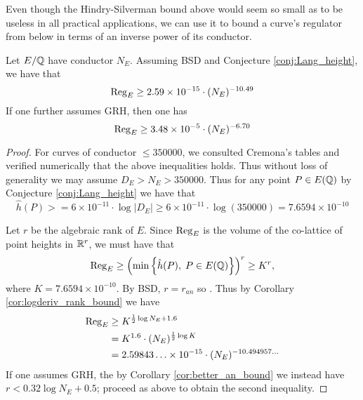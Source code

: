 Even though the Hindry-Silverman bound above would seem so small as to be useless in all practical applications, we can use it to bound a curve's regulator from below in terms of an inverse power of its conductor.
\begin{theorem}\label{thm:regulator_lower_bound}
Let $E/\mathbb{Q}$ have conductor $N_E$. Assuming BSD and Conjecture \ref{conj:Lang_height}, we have that
\begin{equation}
\operatorname{Reg}_E \ge 2.59 \times 10^{-15} \cdot (N_E)^{-10.49}
\end{equation}
If one further assumes GRH, then one has
\begin{equation}
\operatorname{Reg}_E \ge 3.48 \times 10^{-5} \cdot (N_E)^{-6.70}
\end{equation}
\end{theorem}
\begin{proof}
For curves of conductor $\le 350000$, we consulted Cremona's tables and verified numerically that the above inequalities holds. Thus without loss of generality we may assume $D_E > N_E > 350000$. Thus for any point $P \in E(\mathbb{Q})$ by Conjecture \ref{conj:Lang_height} we have that
\begin{equation}
\hat{h}(P) >= 6\times10^{-11} \cdot \log |D_E| \ge 6\times10^{-11} \cdot \log(350000) = 7.6594 \times 10^{-10}
\end{equation}

Let $r$ be the algebraic rank of $E$. Since $\operatorname{Reg}_E$ is the volume of the co-lattice of point heights in $\mathbb{R}^r$, we must have that
\begin{equation*}
\operatorname{Reg}_E \ge \left(\min \left\{ \hat{h}(P), \; P \in E(\mathbb{Q})\right\}\right)^r \ge  K^r,
\end{equation*}
where $K = 7.6594 \times 10^{-10}$. By BSD, $r = r_{an}$ so . Thus by Corollary \ref{cor:logderiv_rank_bound} we have
\begin{align*}
\operatorname{Reg}_E &\ge K^{\frac{1}{2} \log N_E + 1.6} \\
&= K^{1.6} \cdot (N_E)^{\frac{1}{2} \log K} \\
&= 2.59843\ldots \times 10^{-15} \cdot (N_E)^{-10.494957\ldots}
\end{align*}
If one assumes GRH, the by Corollary \ref{cor:better_an_bound} we instead have $r < 0.32 \log N_E + 0.5$; proceed as above to obtain the second inequality.
\end{proof}

